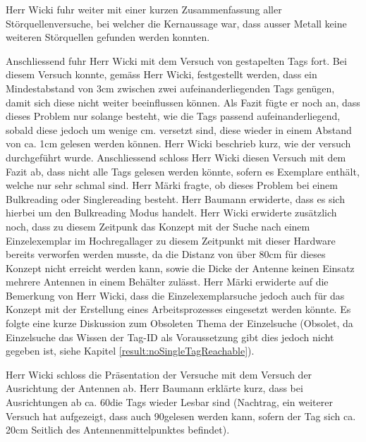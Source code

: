 \documentclass[parskip=full, a4paper]{scrreprt}
\begin{document}
Herr Wicki fuhr weiter mit einer kurzen Zusammenfassung aller Störquellenversuche, bei welcher die Kernaussage war, dass ausser Metall keine weiteren Störquellen gefunden werden konnten.

Anschliessend fuhr Herr Wicki mit dem Versuch von gestapelten Tags fort. Bei diesem Versuch konnte, gemäss Herr Wicki, festgestellt werden, dass ein Mindestabstand von 3cm zwischen zwei aufeinanderliegenden Tags genügen, damit sich diese nicht weiter beeinflussen können. Als Fazit fügte er noch an, dass dieses Problem nur solange besteht, wie die Tags passend aufeinanderliegend, sobald diese jedoch um wenige cm. versetzt sind, diese wieder in einem Abstand von ca. 1cm gelesen werden können.
Herr Wicki beschrieb kurz, wie der versuch durchgeführt wurde. Anschliessend schloss Herr Wicki diesen Versuch mit dem Fazit ab, dass nicht alle Tags gelesen werden könnte, sofern es Exemplare enthält, welche nur sehr schmal sind.
Herr Märki fragte, ob dieses Problem bei einem Bulkreading oder Singlereading besteht. Herr Baumann erwiderte, dass es sich hierbei um den Bulkreading Modus handelt. Herr Wicki erwiderte zusätzlich noch, dass zu diesem Zeitpunk das Konzept mit der Suche nach einem Einzelexemplar im Hochregallager zu diesem Zeitpunkt mit dieser Hardware bereits verworfen werden musste, da die Distanz von über 80cm für dieses Konzept nicht erreicht werden kann, sowie die Dicke der Antenne keinen Einsatz mehrere Antennen in einem Behälter zulässt.
Herr Märki erwiderte auf die Bemerkung von Herr Wicki, dass die Einzelexemplarsuche jedoch auch für das Konzept mit der Erstellung eines Arbeitsprozesses eingesetzt werden könnte.
Es folgte eine kurze Diskussion zum Obsoleten Thema der Einzelsuche (Obsolet, da Einzelsuche das Wissen der Tag-ID als Voraussetzung gibt dies jedoch nicht gegeben ist, siehe Kapitel \ref{result:noSingleTagReachable}).

Herr Wicki schloss die Präsentation der Versuche mit dem Versuch der Ausrichtung der Antennen ab. Herr Baumann erklärte kurz, dass bei Ausrichtungen ab ca. 60\SIUnitSymbolDegree die Tags wieder Lesbar sind (Nachtrag, ein weiterer Versuch hat aufgezeigt, dass auch 90\SIUnitSymbolDegree gelesen werden kann, sofern der Tag sich ca. 20cm Seitlich des Antennenmittelpunktes befindet).
\end{document}
